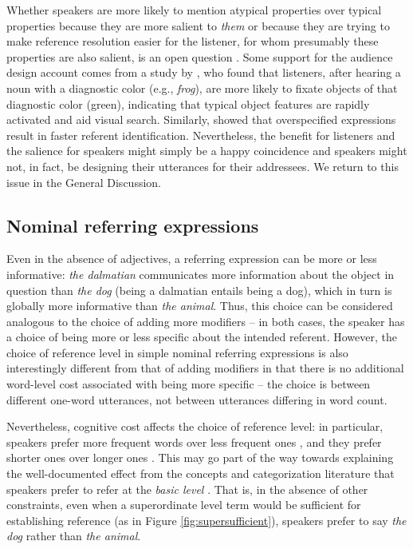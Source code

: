 \documentclass[11pt]{article}
\newcommand{\figref}[1]{Figure \ref{#1}}
\begin{document}
Whether speakers are more likely to mention atypical properties over typical properties because they are more salient to \emph{them} or because they are trying to make reference resolution easier for the listener, for whom presumably these properties are also salient, is an open question \cite{Westerbeek2015}. Some support for the audience design account comes from a study by , who found that listeners, after hearing a noun with a diagnostic color (e.g., \emph{frog}), are more likely to fixate objects of that diagnostic color (green), indicating that typical object features are rapidly activated and aid visual search. Similarly,  showed that overspecified expressions result in faster referent identification.  Nevertheless, the benefit for listeners and the salience for speakers might simply be a happy coincidence and speakers might not, in fact, be designing their utterances for their addressees. We return to this issue in the General Discussion. 


\subsection{Nominal referring expressions}
\label{sec:nominalintro}

Even in the absence of adjectives, a referring expression can be more or less informative: \emph{the dalmatian} communicates more information about the object in question than \emph{the dog} (being a dalmatian entails being a dog), which in turn is globally more informative than \emph{the animal}. 
Thus, this choice can be considered analogous to the choice of adding more modifiers -- in both cases, the speaker has a choice of being more or less specific about the intended referent. However, the choice of reference level in simple nominal referring expressions is also interestingly different from that of adding modifiers in that there is no additional word-level cost associated with being more specific -- the choice is between different one-word utterances, not between utterances differing in word count. 

Nevertheless, cognitive cost affects the choice of reference level: in particular, speakers prefer more frequent words over less frequent ones \cite{oldfield1965response}, and they prefer shorter ones over longer ones \cite{degen2013cost, rohde2012}. This may go part of the way towards explaining the well-documented effect from the concepts and categorization literature that speakers prefer to refer at the \emph{basic level} \cite{Rosch1976, Tanaka1991}. That is, in the absence of other constraints, even when a superordinate level term would be sufficient for establishing reference (as in \figref{fig:supersufficient}), speakers prefer to say \emph{the dog} rather than \emph{the animal}. 
\end{document}
